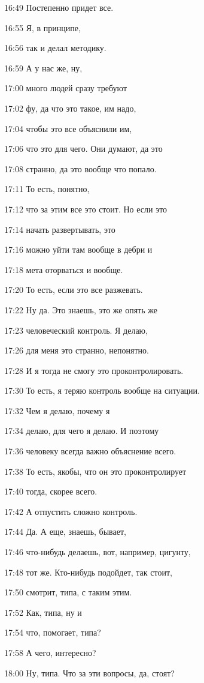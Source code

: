 16:49
Постепенно придет все.

16:55
Я, в принципе,

16:56
так и делал методику.

16:59
А у нас же, ну,

17:00
много людей сразу требуют

17:02
фу, да что это такое, им надо,

17:04
чтобы это все объяснили им,

17:06
что это для чего. Они думают, да это

17:08
странно, да это вообще что попало.

17:11
То есть, понятно,

17:12
что за этим все это стоит. Но если это

17:14
начать развертывать, это

17:16
можно уйти там вообще в дебри и

17:18
мета оторваться и вообще.

17:20
То есть, если это все разжевать.

17:22
Ну да. Это знаешь, это же опять же

17:23
человеческий контроль. Я делаю,

17:26
для меня это странно, непонятно.

17:28
И я тогда не смогу это проконтролировать.

17:30
То есть, я теряю контроль вообще на ситуации.

17:32
Чем я делаю, почему я

17:34
делаю, для чего я делаю. И поэтому

17:36
человеку всегда важно объяснение всего.

17:38
То есть, якобы, что он это проконтролирует

17:40
тогда, скорее всего.

17:42
А отпустить сложно контроль.

17:44
Да. А еще, знаешь, бывает,

17:46
что-нибудь делаешь, вот, например, цигунту,

17:48
тот же. Кто-нибудь подойдет, так стоит,

17:50
смотрит, типа, с таким этим.

17:52
Как, типа, ну и

17:54
что, помогает, типа?

17:58
А чего, интересно?

18:00
Ну, типа. Что за эти вопросы, да, стоят?

